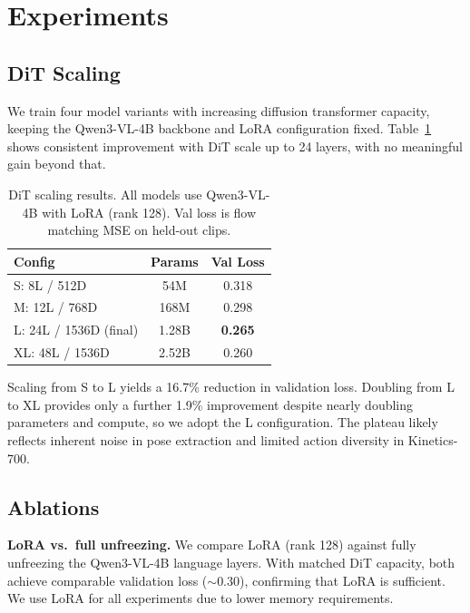 \documentclass[letterpaper, 10pt, conference]{ieeeconf}
\begin{document}
\section{Experiments}

\subsection{DiT Scaling}
\label{sec:scaling}

We train four model variants with increasing diffusion transformer capacity, keeping the Qwen3-VL-4B backbone and LoRA configuration fixed. Table~\ref{tab:scaling} shows consistent improvement with DiT scale up to 24 layers, with no meaningful gain beyond that.

\begin{table}[h]
\centering
\caption{DiT scaling results. All models use Qwen3-VL-4B with LoRA (rank 128). Val loss is flow matching MSE on held-out clips.}
\label{tab:scaling}
\begin{tabular}{lcc}
\toprule
\textbf{Config} & \textbf{Params} & \textbf{Val Loss} \\
\midrule
S: 8L / 512D & 54M & 0.318 \\
M: 12L / 768D & 168M & 0.298 \\
L: 24L / 1536D (final) & 1.28B & \textbf{0.265} \\
XL: 48L / 1536D & 2.52B & 0.260 \\
\bottomrule
\end{tabular}
\end{table}

Scaling from S to L yields a 16.7\% reduction in validation loss. Doubling from L to XL provides only a further 1.9\% improvement despite nearly doubling parameters and compute, so we adopt the L configuration. The plateau likely reflects inherent noise in pose extraction and limited action diversity in Kinetics-700.

\subsection{Ablations}
\label{sec:ablations}

\textbf{LoRA vs.\ full unfreezing.} We compare LoRA (rank 128) against fully unfreezing the Qwen3-VL-4B language layers. With matched DiT capacity, both achieve comparable validation loss ($\sim$0.30), confirming that LoRA is sufficient. We use LoRA for all experiments due to lower memory requirements.
\end{document}
